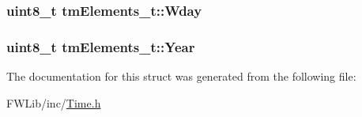 \label{structtm_elements__t_acd5c5f6eb6954a8df534149ea25f2fb4}
\hypertarget{structtm_elements__t_ae1f337c19bc58f7de1dfe21eb3edb525}{
\subsubsection[{Wday}]{\setlength{\rightskip}{0pt plus 5cm}uint8\_\-t {\bf tmElements\_\-t::Wday}}}
\label{structtm_elements__t_ae1f337c19bc58f7de1dfe21eb3edb525}
\hypertarget{structtm_elements__t_a9992cbef99e28651b9905c90698e8ca9}{
\subsubsection[{Year}]{\setlength{\rightskip}{0pt plus 5cm}uint8\_\-t {\bf tmElements\_\-t::Year}}}
\label{structtm_elements__t_a9992cbef99e28651b9905c90698e8ca9}


The documentation for this struct was generated from the following file:\begin{DoxyCompactItemize}
\item 
FWLib/inc/\hyperlink{_time_8h}{Time.h}\end{DoxyCompactItemize}
